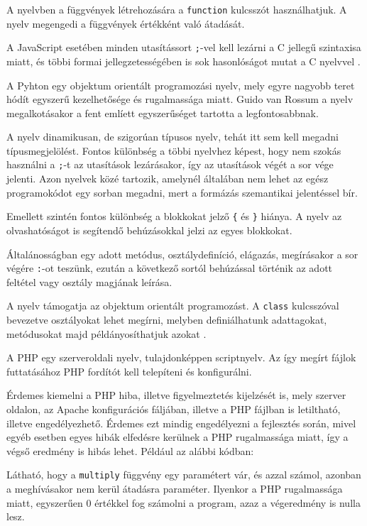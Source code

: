A nyelvben a függvények létrehozására a \texttt{function} kulcsszót használhatjuk. A nyelv megengedi a függvények értékként való átadását.

A JavaScript esetében minden utasítássort \texttt{;}-vel kell lezárni a C jellegű szintaxisa miatt, és többi formai jellegzetességében is sok hasonlóságot mutat a C nyelvvel \cite{javascript}.


A Pyhton egy objektum orientált programozási nyelv, mely egyre nagyobb teret hódít egyszerű kezelhetősége és rugalmassága miatt. Guido van Rossum a nyelv megalkotásakor a fent emlíett egyszerűséget tartotta a legfontosabbnak.

A nyelv dinamikusan, de szigorúan típusos nyelv, tehát itt sem kell megadni típusmegjelölést.
Fontos különbség a többi nyelvhez képest, hogy nem szokás használni a \texttt{;}-t az utasítások lezárásakor, így az utasítások végét a sor vége jelenti. Azon nyelvek közé tartozik, amelynél általában nem lehet az egész programokódot egy sorban megadni, mert a formázás szemantikai jelentéssel bír.

Emellett szintén fontos különbség a blokkokat jelző \texttt{\{} és \texttt{\}} hiánya.
A nyelv az olvashatóságot is segítendő behúzásokkal jelzi az egyes blokkokat.

Általánosságban egy adott metódus, osztálydefiníció, elágazás, megírásakor a sor végére \texttt{:}-ot teszünk, ezután a következő sortól behúzással történik az adott feltétel vagy osztály magjának leírása.

A nyelv támogatja az objektum orientált programozást. A \texttt{class} kulcsszóval bevezetve osztályokat lehet megírni, melyben definiálhatunk adattagokat, metódusokat majd példányosíthatjuk azokat \cite{python}.


A PHP egy szerveroldali nyelv, tulajdonképpen scriptnyelv. Az így megírt fájlok futtatásához PHP fordítót kell telepíteni és konfigurálni.

Érdemes kiemelni a PHP hiba, illetve figyelmeztetés kijelzését is, mely szerver oldalon, az Apache konfigurációs fáljában, illetve a PHP fájlban is letiltható, illetve engedélyezhető. Érdemes ezt mindig engedélyezni a fejlesztés során, mivel egyéb esetben egyes hibák elfedésre kerülnek a PHP rugalmassága miatt, így a végső eredmény is hibás lehet. Például az alábbi kódban:
Látható, hogy a \texttt{multiply} függvény egy paramétert vár, és azzal számol, azonban a meghívásakor nem kerül átadásra paraméter. Ilyenkor a PHP rugalmassága miatt, egyszerűen 0 értékkel fog számolni a program, azaz a végeredmény is nulla lesz.

